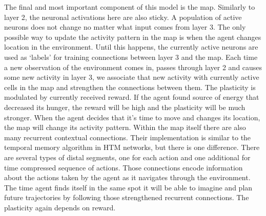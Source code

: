 \documentclass[12pt]{article}
\begin{document}
The final and most important component of this model is the map. Similarly to layer 2, the neuronal activations here are also sticky. A population of active neurons does not change no matter what input comes from layer 3. The only possible way to update the activity pattern in the map is when the agent changes location in the environment. Until this happens, the currently active neurons are used as `labels' for training connections between layer 3 and the map. Each time a new observation of the environment comes in, passes through layer 2 and causes some new activity in layer 3, we associate that new activity with currently active cells in the map and strengthen the connections between them. The plasticity is modulated by currently received reward. If the agent found source of energy that decreased its hunger, the reward will be high and the plasticity will be much stronger. When the agent decides that it's time to move and changes its location, the map will change its activity pattern. Within the map itself there are also many recurrent contextual connections. Their implementation is similar to the temporal memory algorithm in HTM networks, but there is one difference. There are several types of distal segments, one for each action and one additional for time compressed sequence of actions. Those connections encode information about the actions taken by the agent as it navigates through the environment. The time agent finds itself in the same spot it will be able to imagine and plan future trajectories by following those strengthened recurrent connections. The plasticity again depends on reward.
\end{document}
